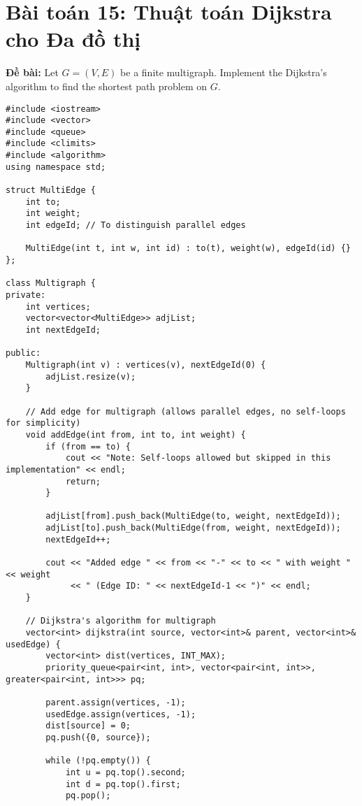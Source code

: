 \documentclass[12pt,a4paper]{article}
\begin{document}
\section{Bài toán 15: Thuật toán Dijkstra cho Đa đồ thị}

\textbf{Đề bài:} Let $G = (V, E)$ be a finite multigraph. Implement the Dijkstra's algorithm to find the shortest path problem on $G$.

\begin{lstlisting}[caption={Thuật toán Dijkstra cho đa đồ thị}]
#include <iostream>
#include <vector>
#include <queue>
#include <climits>
#include <algorithm>
using namespace std;

struct MultiEdge {
    int to;
    int weight;
    int edgeId; // To distinguish parallel edges
    
    MultiEdge(int t, int w, int id) : to(t), weight(w), edgeId(id) {}
};

class Multigraph {
private:
    int vertices;
    vector<vector<MultiEdge>> adjList;
    int nextEdgeId;
    
public:
    Multigraph(int v) : vertices(v), nextEdgeId(0) {
        adjList.resize(v);
    }
    
    // Add edge for multigraph (allows parallel edges, no self-loops for simplicity)
    void addEdge(int from, int to, int weight) {
        if (from == to) {
            cout << "Note: Self-loops allowed but skipped in this implementation" << endl;
            return;
        }
        
        adjList[from].push_back(MultiEdge(to, weight, nextEdgeId));
        adjList[to].push_back(MultiEdge(from, weight, nextEdgeId));
        nextEdgeId++;
        
        cout << "Added edge " << from << "-" << to << " with weight " << weight 
             << " (Edge ID: " << nextEdgeId-1 << ")" << endl;
    }
    
    // Dijkstra's algorithm for multigraph
    vector<int> dijkstra(int source, vector<int>& parent, vector<int>& usedEdge) {
        vector<int> dist(vertices, INT_MAX);
        priority_queue<pair<int, int>, vector<pair<int, int>>, greater<pair<int, int>>> pq;
        
        parent.assign(vertices, -1);
        usedEdge.assign(vertices, -1);
        dist[source] = 0;
        pq.push({0, source});
        
        while (!pq.empty()) {
            int u = pq.top().second;
            int d = pq.top().first;
            pq.pop();
            

\end{lstlisting}
\end{document}
